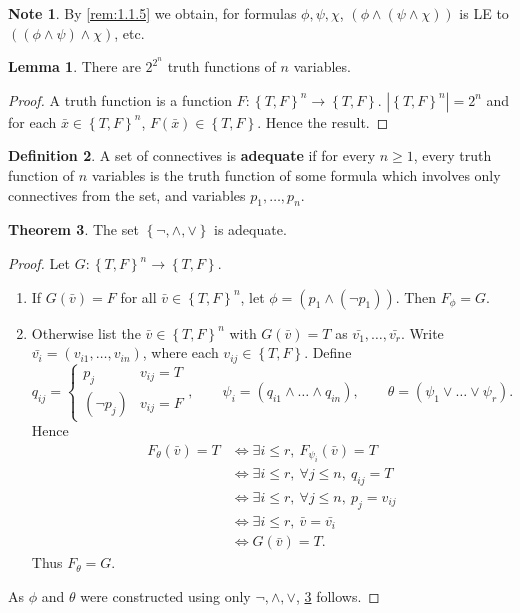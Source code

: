 \documentclass{article}
\newcommand{\rb}[1]{\left( #1 \right)}
\newcommand{\cb}[1]{\left\{ #1 \right\}}
\newcommand{\abs}[1]{\left\lvert #1 \right\rvert}
\newcommand{\notb}[1]{\rb{\neg #1}}
\newcommand{\andb}[2]{\rb{#1 \land #2}}
\theoremstyle{definition}\newtheorem{definition}{Definition}[subsection]
\theoremstyle{definition}\newtheorem{remark}[definition]{Remark}
\theoremstyle{definition}\newtheorem*{example}{Example}
\theoremstyle{definition}\newtheorem*{note}{Note}
\newtheorem{lemma}[definition]{Lemma}
\newtheorem{theorem}[definition]{Theorem}
\begin{document}
\begin{note}
By \ref{rem:1.1.5} we obtain, for formulas $ \phi, \psi, \chi $, $ \andb{\phi}{\andb{\psi}{\chi}} $ is LE to $ \andb{\andb{\phi}{\psi}}{\chi} $, etc.
\end{note}

\begin{lemma}
There are $ 2^{2^n} $ truth functions of $ n $ variables.
\end{lemma}

\begin{proof}
A truth function is a function $ F : \cb{T, F}^n \to \cb{T, F} $. $ \abs{\cb{T, F}^n} = 2^n $ and for each $ \bar{x} \in \cb{T, F}^n $, $ F\rb{\bar{x}} \in \cb{T, F} $. Hence the result.
\end{proof}

\begin{definition}
A set of connectives is \textbf{adequate} if for every $ n \ge 1 $, every truth function of $ n $ variables is the truth function of some formula which involves only connectives from the set, and variables $ p_1, \dots, p_n $.
\end{definition}

\begin{theorem}
\label{thm:1.1.9}
The set $ \cb{\neg, \land, \lor} $ is adequate.
\end{theorem}

\begin{proof}
Let $ G : \cb{T, F}^n \to \cb{T, F} $.
\begin{enumerate}
\item If $ G\rb{\bar{v}} = F $ for all $ \bar{v} \in \cb{T, F}^n $, let $ \phi = \andb{p_1}{\notb{p_1}} $. Then $ F_\phi = G $.
\item Otherwise list the $ \bar{v} \in \cb{T, F}^n $ with $ G\rb{\bar{v}} = T $ as $ \bar{v_1}, \dots, \bar{v_r} $. Write $ \bar{v_i} = \rb{v_{i1}, \dots, v_{in}} $, where each $ v_{ij} \in \cb{T, F} $. Define
$$ q_{ij} = \begin{cases} p_j & v_{ij} = T \\ \notb{p_j} & v_{ij} = F \end{cases}, \qquad \psi_i = \rb{q_{i1} \land \dots \land q_{in}}, \qquad \theta = \rb{\psi_1 \lor \dots \lor \psi_r}. $$
Hence
\begin{align*}
F_\theta\rb{\bar{v}} = T
& \iff \exists i \le r, \ F_{\psi_i}\rb{\bar{v}} = T \\
& \iff \exists i \le r, \ \forall j \le n, \ q_{ij} = T \\
& \iff \exists i \le r, \ \forall j \le n, \ p_j = v_{ij} \\
& \iff \exists i \le r, \ \bar{v} = \bar{v_i} \\
& \iff G\rb{\bar{v}} = T.
\end{align*}
Thus $ F_\theta = G $.
\end{enumerate}
As $ \phi $ and $ \theta $ were constructed using only $ \neg, \land, \lor $, \ref{thm:1.1.9} follows.
\end{proof}
\end{document}

